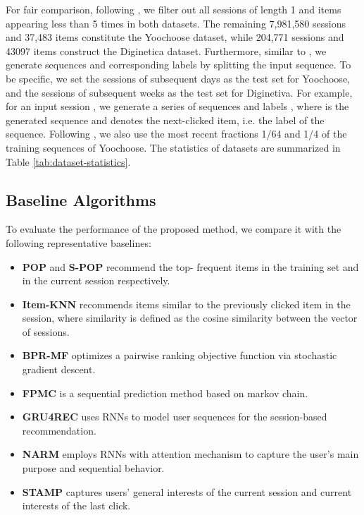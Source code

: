\documentclass[letterpaper]{article} \usepackage{cite}
\begin{document}
For fair comparison, following \cite{Li:2017:NAS:3132847.3132926,Liu:2018:SSA:3219819.3219950}, we filter out all sessions of length 1 and items appearing less than 5 times in both datasets.
The remaining 7,981,580 sessions and 37,483 items constitute the Yoochoose dataset, while 204,771 sessions and 43097 items construct the Diginetica dataset. Furthermore, similar to \cite{Tan:2016:IRN:2988450.2988452}, we generate sequences and corresponding labels by splitting the input sequence. To be specific, we set the sessions of subsequent days as the test set for Yoochoose, and the sessions of subsequent weeks as the test set for Diginetiva. For example, for an input session , we generate a series of sequences and labels  , where  is the generated sequence and  denotes the next-clicked item, i.e. the label of the sequence. Following \cite{Li:2017:NAS:3132847.3132926,Liu:2018:SSA:3219819.3219950}, we also use the most recent fractions 1/64 and 1/4 of the training sequences of Yoochoose. The statistics of datasets are summarized in Table \ref{tab:dataset-statistics}.

\subsection{Baseline Algorithms}

To evaluate the performance of the proposed method, we compare it with the following representative baselines:

\begin{itemize}
	\item {\bf POP} and {\bf S-POP} recommend the top- frequent items in the training set and in the current session respectively.
	\item {\bf Item-KNN} \cite{Sarwar2001} recommends items similar to the previously clicked item in the session, where similarity is defined as the cosine similarity between the vector of sessions.
	\item {\bf BPR-MF} \cite{rendle2009bpr} optimizes a pairwise ranking objective function via stochastic gradient descent.
	\item {\bf FPMC} \cite{rendle2010factorizing} is a sequential prediction method based on markov chain.
	\item {\bf GRU4REC} \cite{DBLP:journals/corr/HidasiKBT15} uses RNNs to model user sequences for the session-based recommendation.
	\item {\bf NARM} \cite{Li:2017:NAS:3132847.3132926} employs RNNs with attention mechanism to capture the user's main purpose and sequential behavior.
	\item {\bf STAMP} \cite{Liu:2018:SSA:3219819.3219950} captures users' general interests of the current session and current interests of the last click.
\end{itemize}
\end{document}
